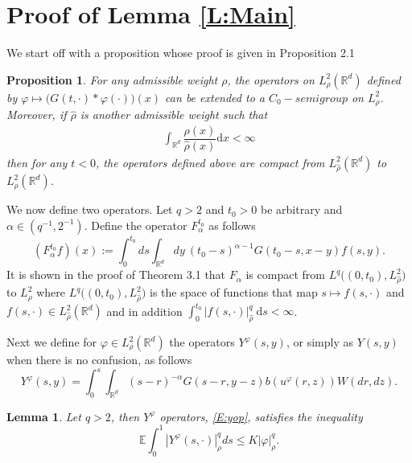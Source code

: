 \documentclass[a4paper,11pt]{article}%
\numberwithin{equation}{section}
\theoremstyle{plain}
\newtheorem{lemma}[theorem]{Lemma}
\newtheorem{proposition}[theorem]{Proposition}
\theoremstyle{definition}
\newcommand{\R}{\mathbb{R}}
\newcommand{\E}{\mathbb{E}}
\newcommand{\ud}{\ensuremath{ \mathrm{d} }}
\begin{document}
\section{Proof of Lemma \ref{L:Main}}
We start off  with a proposition whose proof is given in Proposition 2.1 \cite{TZ98}

\begin{proposition}
	\label{P:weight}
	For any admissible weight $\rho$, the operators on $L^2_\rho(\R^d)$ defined by $\varphi \mapsto \big(G(t,\cdot)*\varphi(\cdot)\big)(x)$ can be extended to a $C_0-semigroup$ on $L^2_\rho$. Moreover, if $\widehat{\rho}$ is another admissible weight such that
	\begin{align*}
	\int_{\R^d}\dfrac{\rho(x)}{\widehat{\rho}(x)}\ud x < \infty
	\end{align*}
	then for any $t<0$, the operators defined above are compact from $L^2_{\widehat{\rho}}(\R^d)$ to $L^2_\rho(\R^d)$.
\end{proposition}

We now define two operators. Let $q>2$ and $t_0>0$ be arbitrary and $\alpha \in (q^{-1},2^{-1})$. Define the operator $F_\alpha^{t_0}$ as follows
\begin{equation}
\label{E:fop}
\left(F_{\alpha}^{t_0} f\right)(x) := \int_0^{t_0} ds \int_{\R^d} dy \: (t_0-s)^{\alpha-1}G(t_0-s,x-y)f(s,y) .
\end{equation}
It is shown in the proof of Theorem 3.1 \cite{TZ98} that $F_\alpha$ is compact from $L^q\big((0,t_0),L^2_{\widehat{\rho}} \big)$ to
$L^2_\rho$ where $L^q\big((0,t_0),L^2_{\widehat{\rho}} \big)$ is the space of functions that map $s \mapsto f(s,\cdot)$ and
$f(s,\cdot) \in L^2_{\widehat{\rho}}(\R^d)$ and in addition $\int_0^{t_0} |f(s,\cdot)|_{\widehat{\rho}}^q \: \ud s < \infty$.

Next we define for $\varphi \in L^2_{\rho}(\R^d)$ the operators $Y^\varphi(s,y)$, or simply as $Y(s,y)$ when there is no
confusion, as follows
\begin{equation}
\label{E:yop}
Y^\varphi(s,y) =\int_0^s \int_{\R^d} (s-r)^{-\alpha}G(s-r,y-z)b(u^\varphi(r,z))W(dr,dz).
\end{equation}

\begin{lemma}
	\label{L:yineq}
	Let $q>2$, then $Y^\varphi$ operators, \eqref{E:yop}, satisfies the inequality
	\begin{equation}
	\label{E:yineq}
	\E\int_0^1 |Y^\varphi(s,\cdot)|_{\rho}^q ds \le K|\varphi|_\rho^q .
	\end{equation}
\end{lemma}
\end{document}
